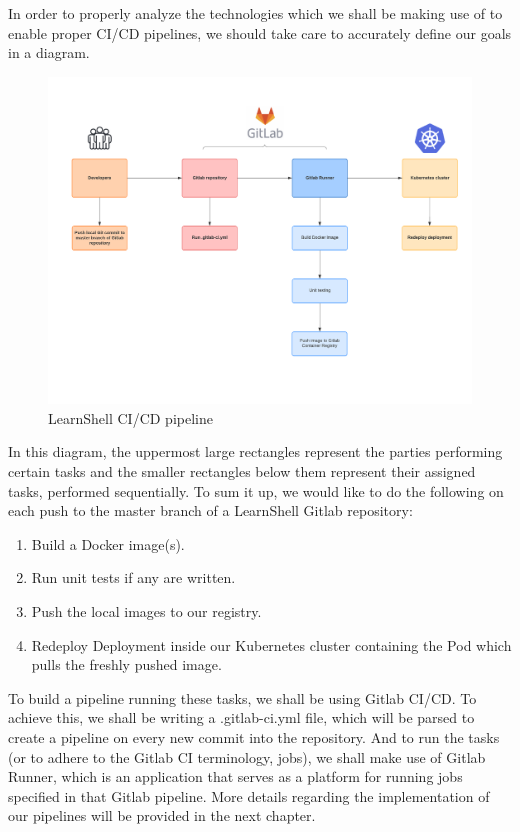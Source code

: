 \documentclass[thesis=B,english]{FITthesis}[2019/12/23]
\begin{document}
In order to properly analyze the technologies which we shall be making use of to enable proper CI/CD pipelines, we should take care to accurately define our goals in a diagram.

\begin{figure}[H]
\centering
\caption{LearnShell CI/CD pipeline}
\hspace*{-3.6cm}
\includegraphics[scale=0.7]{learnshell-cicd}
\end{figure}

In this diagram, the uppermost large rectangles represent the parties performing certain tasks and the smaller rectangles below them represent their assigned tasks, performed sequentially. To sum it up, we would like to do the following on each push to the master branch of a LearnShell Gitlab repository:

\begin{enumerate}
  \setlength\itemsep{0em}
  \item Build a Docker image(s).
  \item Run unit tests if any are written.
  \item Push the local images to our registry.
  \item Redeploy Deployment inside our Kubernetes cluster containing the Pod which pulls the freshly pushed image.
\end{enumerate}

To build a pipeline running these tasks, we shall be using Gitlab CI/CD. To achieve this, we shall be writing a .gitlab-ci.yml file, which will be parsed to create a pipeline on every new commit into the repository. And to run the tasks (or to adhere to the Gitlab CI terminology, jobs), we shall make use of Gitlab Runner, which is an application that serves as a platform for running jobs specified in that Gitlab pipeline. More details regarding the implementation of our pipelines will be provided in the next chapter.
\end{document}

